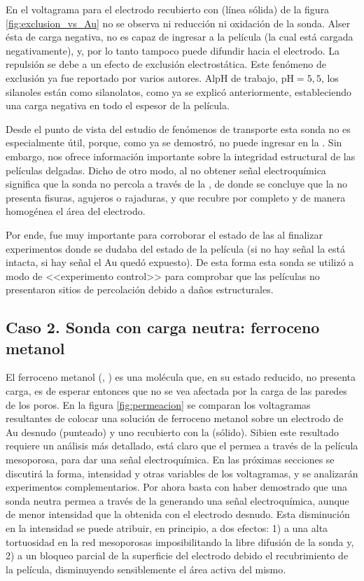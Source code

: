 	 En el voltagrama para el electrodo recubierto con \pdmF\space (línea sólida) de la figura \ref{fig:exclusion_vs_Au} no se observa ni reducción ni oxidación de la sonda. Al\space ser ésta de carga negativa, no es capaz de ingresar a la película (la cual está cargada negativamente), y, por lo tanto tampoco puede difundir hacia el electrodo. La repulsión se debe a un efecto de exclusión electrostática. Este fenómeno de exclusión ya fue reportado por varios autores\cite{alberti2015,schmuhl2005,Andrieu-Brunsen2015,brunsen2011}. Al\space pH de trabajo, $\text{pH}=5,5$, los silanoles están como silanolatos, como ya se explicó anteriormente, estableciendo una carga negativa en todo el espesor de la película.
  
	 Desde el punto de vista del estudio de fenómenos de  transporte esta sonda no es especialmente útil, porque, como ya se demostró, no puede ingresar en la \pdm. Sin embargo, nos ofrece información importante sobre la integridad estructural de las películas delgadas. Dicho de otro modo, al no obtener señal electroquímica significa que la sonda no percola a través de la \pdm, de donde se concluye que la \pdm\space no presenta fisuras, agujeros o rajaduras, y que recubre por completo y de manera homogénea el área del electrodo. 

	 Por ende, fue muy importante para corroborar el estado de las \pdm\space al finalizar experimentos donde se dudaba del estado de la película (si no hay señal la \pdm\space está intacta, si hay señal el Au quedó expuesto). De esta forma esta sonda se utilizó a modo de <<experimento control>> para comprobar que las películas no presentaron sitios de percolación debido a daños estructurales.

	\subsection{Caso 2. Sonda con carga neutra: ferroceno metanol}

		El ferroceno metanol (\ferroceno, \fc) es una molécula que, en su estado reducido, no presenta carga, es de esperar entonces que no se vea afectada por la carga de las paredes de los poros. En la figura \ref{fig:permeacion} se comparan los voltagramas resultantes de colocar una solución de ferroceno metanol sobre un electrodo de Au desnudo (punteado) y uno recubierto con la \pdm\space (sólido). Si\space bien este resultado  requiere un análisis más detallado, está claro que el \fc\space permea a través de la película mesoporosa, para dar una señal electroquímica. En las próximas secciones se discutirá la forma, intensidad y otras variables de los voltagramas, y se analizarán experimentos complementarios. Por ahora basta con haber demostrado que una sonda neutra permea a través de la \pdm\space generando una señal electroquímica, aunque de menor intensidad que la obtenida con el electrodo desnudo. Esta disminución en la intensidad se puede atribuir, en principio, a dos efectos: 1) a una alta tortuosidad en la red mesoporosas imposibilitando la libre difusión de la sonda y\cite{Etienne2007}, 2) a un bloqueo parcial de la superficie del electrodo debido el recubrimiento de la película, disminuyendo sensiblemente el área activa del mismo\cite{Otal2006}.

